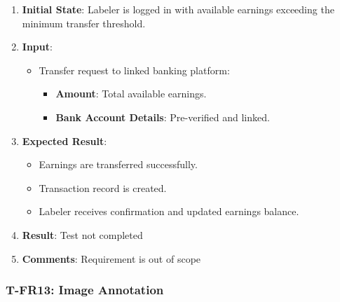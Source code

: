 \documentclass[12pt, titlepage]{article}
\begin{document}
\begin{enumerate}
    \item \textbf{Initial State}: Labeler is logged in with available earnings exceeding the minimum transfer threshold.
    \item \textbf{Input}:
    \begin{itemize}
        \item Transfer request to linked banking platform:
        \begin{itemize}
            \item \textbf{Amount}: Total available earnings.
            \item \textbf{Bank Account Details}: Pre-verified and linked.
        \end{itemize}
    \end{itemize}
        \item \textbf{Expected Result}:
        \begin{itemize}
            \item Earnings are transferred successfully.
            \item Transaction record is created.
            \item Labeler receives confirmation and updated earnings balance.
        \end{itemize}
        \item \textbf{Result}: Test not completed
        \item \textbf{Comments}: Requirement is out of scope
\end{enumerate}

\subsubsection*{T-FR13: Image Annotation}
\end{document}
